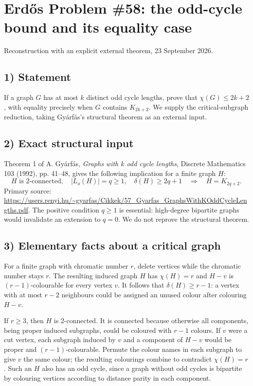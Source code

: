 \section{Erd\H{o}s Problem \#58: the odd-cycle bound and its equality case}
\noindent Reconstruction with an explicit external theorem, 23 September 2026.

\subsection*{1) Statement}
If a graph $G$ has at most $k$ distinct odd cycle lengths, prove that $\chi(G)\le2k+2$, with equality precisely when $G$ contains $K_{2k+2}$. We supply the critical-subgraph reduction, taking Gy\'arf\'as's structural theorem as an external input.

\subsection*{2) Exact structural input}
Theorem 1 of A. Gy\'arf\'as, \emph{Graphs with $k$ odd cycle lengths}, Discrete Mathematics 103 (1992), pp. 41--48, gives the following implication for a finite graph $H$:
\[
 H\text{ is 2-connected},\quad |L_o(H)|=q\ge1,\quad
 \delta(H)\ge2q+1
 \quad\Longrightarrow\quad H=K_{2q+2}.\tag{1}
\]
Primary source: \url{https://users.renyi.hu/~gyarfas/Cikkek/57_Gyarfas_GraphsWithKOddCycleLengths.pdf}.
The positive condition $q\ge1$ is essential: high-degree bipartite graphs would invalidate an extension to $q=0$. We do not reprove the structural theorem.

\subsection*{3) Elementary facts about a critical graph}
For a finite graph with chromatic number $r$, delete vertices while the chromatic number stays $r$. The resulting induced graph $H$ has $\chi(H)=r$ and $H-v$ is $(r-1)$-colourable for every vertex $v$. It follows that $\delta(H)\ge r-1$: a vertex with at most $r-2$ neighbours could be assigned an unused colour after colouring $H-v$.

If $r\ge3$, then $H$ is 2-connected. It is connected because otherwise all components, being proper induced subgraphs, could be coloured with $r-1$ colours. If $v$ were a cut vertex, each subgraph induced by $v$ and a component of $H-v$ would be proper and $(r-1)$-colourable. Permute the colour names in each subgraph to give $v$ the same colour; the resulting colourings combine to contradict $\chi(H)=r$. Such an $H$ also has an odd cycle, since a graph without odd cycles is bipartite by colouring vertices according to distance parity in each component.

